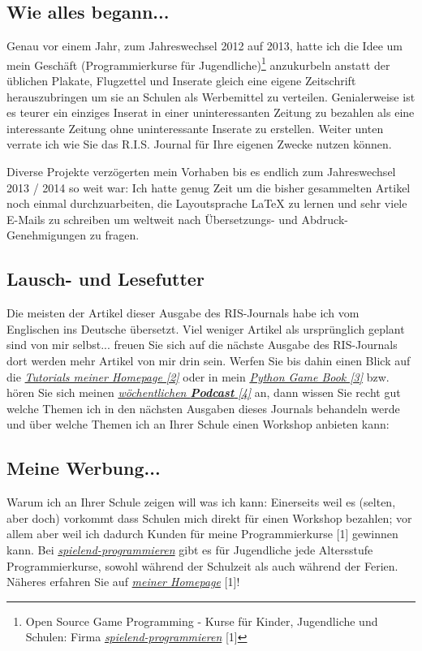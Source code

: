 \documentclass[10pt,a4paper,ngerman,twoside]{article} %
\begin{document}
\subsection*{Wie alles begann...}
Genau vor einem Jahr, zum Jahreswechsel 2012 auf 2013, hatte ich die Idee um mein Geschäft (Programmierkurse für Jugendliche)\footnote{Open Source Game Programming - Kurse für Kinder, Jugendliche und Schulen: Firma \href{http://spielend-programmieren.at}{\textit{spielend-programmieren}} [1]} anzukurbeln anstatt der üblichen Plakate, Flugzettel und Inserate gleich eine eigene Zeitschrift herauszubringen um sie an Schulen als Werbemittel zu verteilen. Genialerweise ist es teurer ein einziges Inserat in einer uninteressanten Zeitung zu bezahlen als eine interessante Zeitung ohne uninteressante Inserate zu erstellen. Weiter unten verrate ich wie Sie das R.I.S. Journal für Ihre eigenen Zwecke nutzen können.

Diverse Projekte verzögerten mein Vorhaben bis es endlich zum Jahreswechsel 2013 / 2014 so weit war: Ich hatte genug Zeit um die bisher gesammelten Artikel noch einmal durchzuarbeiten, die Layoutsprache {\large \LaTeX} zu lernen und sehr viele E-Mails zu schreiben um weltweit nach Übersetzungs- und Abdruck-Genehmigungen zu fragen. 

\subsection*{Lausch- und Lesefutter}
Die meisten der Artikel dieser Ausgabe des RIS-Journals habe ich vom Englischen ins Deutsche übersetzt. Viel weniger Artikel als ursprünglich geplant sind von mir selbst... freuen Sie sich auf die nächste Ausgabe des RIS-Journals dort werden mehr Artikel von mir drin sein. Werfen Sie bis dahin einen Blick auf die \href{http://spielend-programmieren.at/de:tutorials:start}{\textit{Tutorials meiner Homepage [2]}} oder in mein \href{http://thepythongamebook.com}{\textit{Python Game Book [3]}} bzw. hören Sie sich meinen \href{http://biertaucher.at}{\textit{wöchentlichen \textbf{Podcast} [4]}} an, dann wissen Sie recht gut welche Themen ich in den nächsten Ausgaben dieses Journals behandeln werde und über welche Themen ich an Ihrer Schule einen Workshop anbieten kann:

\subsection*{Meine Werbung...}
Warum ich an Ihrer Schule zeigen will was ich kann: Einerseits weil es (selten, aber doch) vorkommt dass Schulen mich direkt für einen Workshop bezahlen; vor allem aber weil ich dadurch Kunden für meine Programmierkurse [1] gewinnen kann. Bei \href{http://spielend-programmieren.at}{\textit{spielend-programmieren}} gibt es für Jugendliche jede Altersstufe Programmierkurse, sowohl während der Schulzeit als auch während der Ferien. Näheres erfahren Sie auf \href{http://spielend-programmieren.at}{\textit{meiner Homepage}} [1]!
\end{document}
